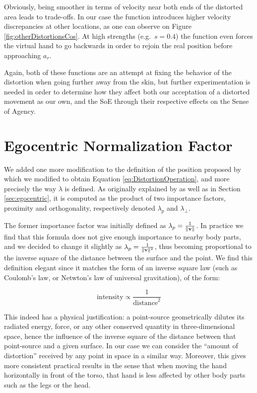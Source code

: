 Obviously, being smoother in terms of velocity near both ends of the distorted area leads to trade-offs. In our case the function introduces higher velocity discrepancies at other locations, as one can observe on Figure \ref{fig:otherDistortionsCos}. At high strengths (e.g.\ $s=0.4$) the function even forces the virtual hand to go backwards in order to rejoin the real position before approaching $a_r$.

Again, both of these functions are an attempt at fixing the behavior of the distortion when going further away from the skin, but further experimentation is needed in order to determine how they affect both our acceptation of a distorted movement as our own, and the SoE through their respective effects on the Sense of Agency.

\section{Egocentric Normalization Factor}

We added one more modification to the definition of the position proposed by \cite{molla2017egocentric} which we modified to obtain Equation \ref{eq:DistortionOperation}, and more precisely the way $\lambda $ is defined. As originally explained by \cite{molla2016precise} as well as in Section \ref{sec:egocentric}, it is computed as the product of two importance factors, proximity and orthogonality, respectively denoted $\lambda_p$ and $\lambda_\perp $.

The former importance factor was initially defined as $\lambda_p = \frac{1}{\lVert\mathbf{v}\rVert}$. In practice we find that this formula does not give enough importance to nearby body parts, and we decided to change it slightly as $\lambda_p = \frac{1}{\lVert\mathbf{v}\rVert^2}$, thus becoming proportional to the inverse square of the distance between the surface and the point. We find this definition elegant since it matches the form of an inverse square law (such as Coulomb's law, or Netwton's law of universal gravitation), of the form:

\begin{equation*}
    \text{intensity} \propto \frac{1}{\text{distance}^2}
\end{equation*}

This indeed has a physical justification: a point-source geometrically dilutes its radiated energy, force, or any other conserved quantity in three-dimensional space, hence the influence of the inverse square of the distance between that point-source and a given surface. In our case we can consider the ``amount of distortion'' received by any point in space in a similar way. Moreover, this gives more consistent practical results in the sense that when moving the hand horizontally in front of the torso, that hand is less affected by other body parts such as the legs or the head.

